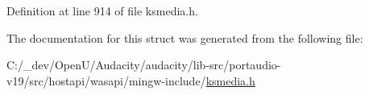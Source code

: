 Definition at line 914 of file ksmedia.\+h.



The documentation for this struct was generated from the following file\+:\begin{DoxyCompactItemize}
\item 
C\+:/\+\_\+dev/\+Open\+U/\+Audacity/audacity/lib-\/src/portaudio-\/v19/src/hostapi/wasapi/mingw-\/include/\hyperlink{ksmedia_8h}{ksmedia.\+h}\end{DoxyCompactItemize}
